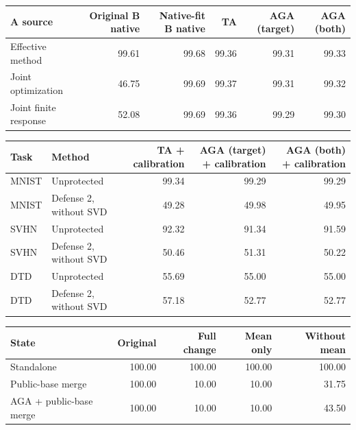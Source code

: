 \begin{tabular}{lrrrrr}
\toprule
A source & Original B native & Native-fit B native & TA & AGA (target) & AGA (both) \\
\midrule
Effective method & 99.61 & 99.68 & 99.36 & 99.31 & 99.33 \\
Joint optimization & 46.75 & 99.69 & 99.37 & 99.31 & 99.32 \\
Joint finite response & 52.08 & 99.69 & 99.36 & 99.29 & 99.30 \\
\bottomrule
\end{tabular}

\begin{tabular}{llrrr}
\toprule
Task & Method & TA + calibration & AGA (target) + calibration & AGA (both) + calibration \\
\midrule
MNIST & Unprotected & 99.34 & 99.29 & 99.29 \\
MNIST & Defense 2, without SVD & 49.28 & 49.98 & 49.95 \\
SVHN & Unprotected & 92.32 & 91.34 & 91.59 \\
SVHN & Defense 2, without SVD & 50.46 & 51.31 & 50.22 \\
DTD & Unprotected & 55.69 & 55.00 & 55.00 \\
DTD & Defense 2, without SVD & 57.18 & 52.77 & 52.77 \\
\bottomrule
\end{tabular}

\begin{tabular}{lrrrr}
\toprule
State & Original & Full change & Mean only & Without mean \\
\midrule
Standalone & 100.00 & 100.00 & 100.00 & 100.00 \\
Public-base merge & 100.00 & 10.00 & 10.00 & 31.75 \\
AGA + public-base merge & 100.00 & 10.00 & 10.00 & 43.50 \\
\bottomrule
\end{tabular}

